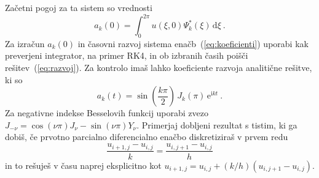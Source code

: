 \documentclass[slovene,11pt,a4paper]{article}
\newcommand{\dd}{\,\mathrm{d}}
\begin{document}
Začetni pogoj za ta sistem so vrednosti
\begin{equation*}
  a_k(0) = \int_0^{2\pi} u(\xi,0) \Psi^*_k(\xi) \dd \xi \>.
\end{equation*}
Za izračun $a_k(0)$ in časovni razvoj sistema enačb~(\ref{eq:koeficienti})
uporabi kak preverjeni integrator, na primer RK4, in ob
izbranih časih poišči rešitev~(\ref{eq:razvoj}).  Za kontrolo imaš
lahko koeficiente razvoja analitične rešitve, ki so
\begin{equation*}
  a_k(t)=\sin\left(\frac{k\pi}{ 2}\right)\,J_k(\pi)\,\mathrm{e}^{\mathrm{i}kt} \>.
\end{equation*}
Za negativne indekse Besselovih funkcij uporabi zvezo
$J_{-\nu} = \cos(\nu\pi) J_\nu - \sin(\nu\pi) Y_\nu$.
Primerjaj dobljeni rezultat s tistim, ki ga dobiš,
če prvotno parcialno diferencialno enačbo diskretiziraš
v prvem redu
\begin{equation*}
\frac{u_{i+1,j} - u_{i,j}}{ k} = \frac{u_{i,j+1} - u_{i,j}}{ h}
\end{equation*}
in to rešuješ v času naprej eksplicitno kot
$u_{i+1,j} = u_{i,j} + (k/h)(u_{i,j+1} - u_{i,j})$.

\end{document}
